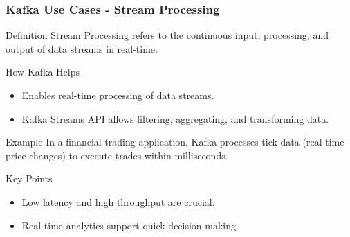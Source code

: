 \documentclass[aspectratio=169]{beamer}
\begin{document}
\begin{frame}[fragile]
    \frametitle{Kafka Use Cases - Stream Processing}
    \begin{block}{Definition}
        Stream Processing refers to the continuous input, processing, and output of data streams in real-time.
    \end{block}
    
    \begin{block}{How Kafka Helps}
        \begin{itemize}
            \item Enables real-time processing of data streams.
            \item Kafka Streams API allows filtering, aggregating, and transforming data.
        \end{itemize}
    \end{block}
    
    \begin{block}{Example}
        In a financial trading application, Kafka processes tick data (real-time price changes) to execute trades within milliseconds.
    \end{block}
    
    \begin{block}{Key Points}
        \begin{itemize}
            \item Low latency and high throughput are crucial.
            \item Real-time analytics support quick decision-making.
        \end{itemize}
    \end{block}
\end{frame}
\end{document}
